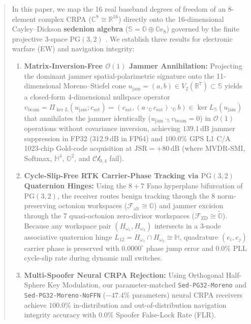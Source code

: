 \documentclass[11pt,a4paper]{article}
\theoremstyle{definition}
\theoremstyle{remark}
\newcommand{\R}{\mathbb{R}}
\newcommand{\C}{\mathbb{C}}
\newcommand{\Ha}{\mathbb{H}}
\newcommand{\Oc}{\mathbb{O}}
\newcommand{\Se}{\mathbb{S}}
\newcommand{\PG}{\mathrm{PG}}
\newcommand{\Falt}{\mathcal{F}_{\mathrm{alt}}}
\newcommand{\Fzd}{\mathcal{F}_{\mathrm{ZD}}}
\newcommand{\PiNull}{\Pi_{\ker L}}
\begin{document}
\begin{abstract}
In this paper, we map the 16 real baseband degrees of freedom of an 8-element complex CRPA ($\C^8 \cong \R^{16}$) directly onto the 16-dimensional Cayley--Dickson \textbf{sedenion algebra} ($\Se = \Oc \oplus \Oc e_8$) governed by the finite projective 3-space $\PG(3,2)$ \cite{Agourakis2026PG32}. We establish three results for electronic warfare (EW) and navigation integrity:
\begin{enumerate}
    \item \textbf{Matrix-Inversion-Free $\mathcal{O}(1)$ Jammer Annihilation:} Projecting the dominant jammer spatial-polarimetric signature onto the 11-dimensional Moreno--Stiefel cone $u_{\mathrm{jam}} = (a, b) \in V_2(\R^7) \subset \Se$ yields a closed-form 4-dimensional nullspace operator $v_{\mathrm{beam}} = \PiNull(u_{\mathrm{jam}}; c_{\mathrm{sat}}) = (c_{\mathrm{sat}}, (a \cdot_{\Oc} c_{\mathrm{sat}}) \cdot_{\Oc} b) \in \ker L_{\Se}(u_{\mathrm{jam}})$ that annihilates the jammer identically ($u_{\mathrm{jam}} \cdot_{\Se} v_{\mathrm{beam}} = 0$) in $\mathcal{O}(1)$ operations without covariance inversion, achieving $\mathbf{139.1\,\mathrm{dB}}$ jammer suppression in FP32 ($\mathbf{312.9\,\mathrm{dB}}$ in FP64) and $\mathbf{100.0\%}$ GPS L1 C/A 1023-chip Gold-code acquisition at $\mathrm{JSR} = +80\,\mathrm{dB}$ (where MVDR-SMI, Softmax, $\Ha^4$, $\Oc^2$, and $\mathcal{Cl}_{0,4}$ fail).
    \item \textbf{Cycle-Slip-Free RTK Carrier-Phase Tracking via $\PG(3,2)$ Quaternion Hinges:} Using the $8+7$ Fano hyperplane bifurcation of $\PG(3,2)$, the receiver routes benign tracking through the 8 norm-preserving octonion workspaces ($\Falt \cong \Oc$) and jammer excision through the 7 quasi-octonion zero-divisor workspaces ($\Fzd \cong \tilde{\Oc}$). Because any workspace pair $(H_{\omega_1}, H_{\omega_2})$ intersects in a 3-node associative quaternion hinge $L_{12} = H_{\omega_1} \cap H_{\omega_2} \cong \Ha$, quadrature $(e_i, e_j)$ carrier phase is preserved with $\mathbf{0.0000^\circ}$ phase jump error and $\mathbf{0.0\%}$ PLL cycle-slip rate during dynamic null switches.
    \item \textbf{Multi-Spoofer Neural CRPA Rejection:} Using Orthogonal Half-Sphere Key Modulation, our parameter-matched \texttt{Sed-PG32-Moreno} and \texttt{Sed-PG32-Moreno-NoFFN} ($-47.4\%$ parameters) neural CRPA receivers achieve $\mathbf{100.0\%}$ in-distribution and out-of-distribution navigation integrity accuracy with $\mathbf{0.0\%}$ Spoofer False-Lock Rate (FLR).
\end{enumerate}
\end{abstract}
\end{document}
